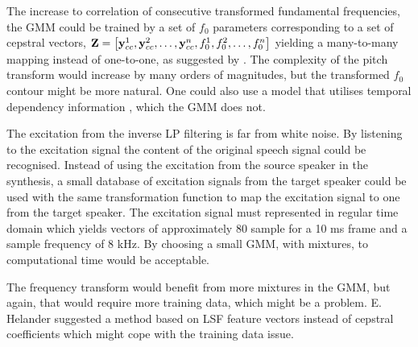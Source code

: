 The increase to correlation of consecutive transformed fundamental frequencies, the GMM could be trained by a set of $f_0$ parameters corresponding to a set of cepstral vectors, $\mathbf{Z}=\left[\mathbf{y}_{cc}^1,\mathbf{y}_{cc}^2,\dotsc,\mathbf{y}_{cc}^n,f_{0}^1,f_{0}^2,\dotsc,f_{0}^n\right]$ yielding a many-to-many mapping instead of one-to-one, as suggested by \cite{najjary04}. The complexity of the pitch transform would increase by many orders of magnitudes, but the transformed $f_0$ contour might be more natural. One could also use a model that utilises temporal dependency information \cite{kim97}, which the GMM does not.

The excitation from the inverse LP filtering is far from white noise. By listening to the excitation signal the content of the original speech signal could be recognised. Instead of using the excitation from the source speaker in the synthesis, a small database of excitation signals from the target speaker could be used with the same transformation function to map the excitation signal to one from the target speaker. The excitation signal must represented in regular time domain which yields vectors of approximately 80 sample for a 10 ms frame and a sample frequency of 8 kHz. By choosing a small GMM, with  mixtures, to computational time would be acceptable.

The frequency transform would benefit from more mixtures in the GMM, but again, that would require more training data, which might be a problem. E. Helander \cite{helander08} suggested a method based on LSF feature vectors instead of cepstral coefficients which might cope with the training data issue.


